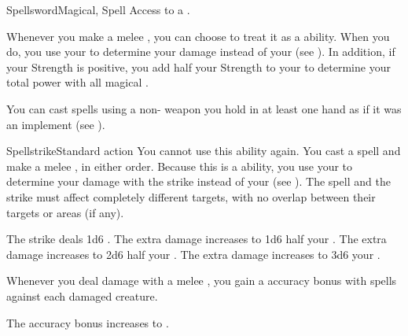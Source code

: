   \begin{magicalfeat}{Spellsword}{Magical, Spell}
    \featpre Access to a .

    Whenever you make a melee , you can choose to treat it as a \magical ability.
    When you do, you use your  to determine your damage instead of your  (see ).
    In addition, if your Strength is positive, you add half your Strength to your  to determine your total power with all magical .

     You can cast spells using a non- weapon you hold in at least one hand as if it was an implement (see ).

    \begin{magicalactiveability}{Spellstrike}{Standard action}
      \abilitycost You  cannot use this ability again.
      \rankline
      You cast a spell and make a melee , in either order.
      Because this is a \magical ability, you use your  to determine your damage with the strike instead of your  (see ).
      The spell and the strike must affect completely different targets, with no overlap between their targets or areas (if any).

      \rankline
       The strike deals 1d6 .
       The extra damage increases to 1d6 \add half your .
       The extra damage increases to 2d6 \add half your .
       The extra damage increases to 3d6 \add your .
    \end{magicalactiveability}

     Whenever you deal damage with a melee , you  gain a  accuracy bonus with spells against each damaged creature.

     The accuracy bonus increases to .
  \end{magicalfeat}

